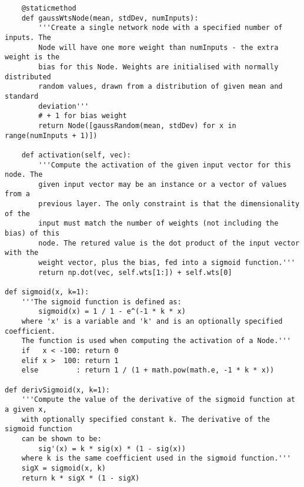 \documentclass{article}
\begin{document}
\begin{verbatim}
    @staticmethod
    def gaussWtsNode(mean, stdDev, numInputs):
        '''Create a single network node with a specified number of inputs. The
        Node will have one more weight than numInputs - the extra weight is the
        bias for this Node. Weights are initialised with normally distributed
        random values, drawn from a distribution of given mean and standard
        deviation'''
        # + 1 for bias weight
        return Node([gaussRandom(mean, stdDev) for x in range(numInputs + 1)])

    def activation(self, vec):
        '''Compute the activation of the given input vector for this node. The
        given input vector may be an instance or a vector of values from a
        previous layer. The only constraint is that the dimensionality of the
        input must match the number of weights (not including the bias) of this
        node. The retured value is the dot product of the input vector with the
        weight vector, plus the bias, fed into a sigmoid function.'''
        return np.dot(vec, self.wts[1:]) + self.wts[0]

def sigmoid(x, k=1):
    '''The sigmoid function is defined as:
        sigmoid(x) = 1 / 1 - e^(-1 * k * x)
    where 'x' is a variable and 'k' and is an optionally specified coefficient.
    The function is used when computing the activation of a Node.'''
    if   x < -100: return 0
    elif x >  100: return 1
    else         : return 1 / (1 + math.pow(math.e, -1 * k * x))

def derivSigmoid(x, k=1):
    '''Compute the value of the derivative of the sigmoid function at a given x,
    with optionally specified constant k. The derivative of the sigmoid function
    can be shown to be:
        sig'(x) = k * sig(x) * (1 - sig(x))
    where k is the same coefficient used in the sigmoid function.'''
    sigX = sigmoid(x, k)
    return k * sigX * (1 - sigX)

\end{verbatim}
\end{document}
